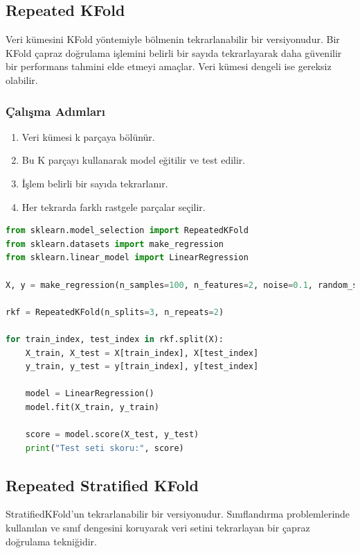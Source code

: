 \subsection{Repeated KFold}
Veri kümesini KFold yöntemiyle bölmenin tekrarlanabilir bir versiyonudur. Bir KFold çapraz doğrulama işlemini belirli bir sayıda tekrarlayarak daha güvenilir bir performans tahmini elde etmeyi amaçlar. Veri kümesi dengeli ise gereksiz olabilir.

\subsubsection{Çalışma Adımları}
\begin{enumerate}
    \item Veri kümesi k parçaya bölünür.
    \item Bu K parçayı kullanarak model eğitilir ve test edilir.
    \item İşlem belirli bir sayıda tekrarlanır.
    \item Her tekrarda farklı rastgele parçalar seçilir.
\end{enumerate}

\begin{lstlisting}[language=Python, caption=Scikit-learn'de Repeated KFold örneği.]
from sklearn.model_selection import RepeatedKFold
from sklearn.datasets import make_regression
from sklearn.linear_model import LinearRegression

X, y = make_regression(n_samples=100, n_features=2, noise=0.1, random_state=42)

rkf = RepeatedKFold(n_splits=3, n_repeats=2)

for train_index, test_index in rkf.split(X):
    X_train, X_test = X[train_index], X[test_index]
    y_train, y_test = y[train_index], y[test_index]
    
    model = LinearRegression()
    model.fit(X_train, y_train)
    
    score = model.score(X_test, y_test)
    print("Test seti skoru:", score)
\end{lstlisting}


\subsection{Repeated Stratified KFold}
StratifiedKFold'un tekrarlanabilir bir versiyonudur. Sınıflandırma problemlerinde kullanılan ve sınıf dengesini koruyarak veri setini tekrarlayan bir çapraz doğrulama tekniğidir.

